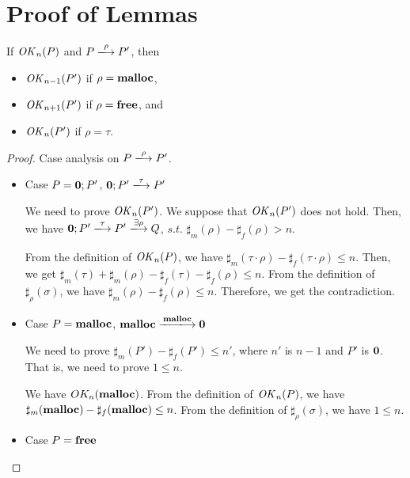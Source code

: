 \section{Proof of Lemmas}
\label{sec:proof}

\begin{lemma}
\label{lem:okPreserved}
If \(\mathit{OK}_n(P)\) and \(P \xlongrightarrow{\rho} P'\), then
\begin{itemize}
\item \(\mathit{OK}_{n-1}(P')\) if \(\rho = \mathbf{malloc}\),
\item \(\mathit{OK}_{n+1}(P')\) if \(\rho = \mathbf{free}\), and
\item \(\mathit{OK}_n(P')\) if \(\rho = \tau\).
\end{itemize}
\end{lemma}
\begin{proof}

Case analysis on \(P \xlongrightarrow{\rho} P'\).

\begin{itemize}
\item Case $P = \mathbf{0};P'$, \Rtab \(\TSKIP;P' \xlongrightarrow{\tau} P'\)

  We need to prove \(\mathit{OK}_n(P')\).   We suppose that
  \(\mathit{OK}_n(P')\) does not hold. Then, we have \(\TSKIP;P'
  \xlongrightarrow{\tau} P' \xlongrightarrow{\exists \rho}
  Q\), \(s.t.\) \(\sharp_{m}(\rho) - \sharp_{f}(\rho) > n\).

  From the definition of \(\mathit{OK}_n(P)\), we have \(\sharp_m(\tau \cdot
  \rho) - \sharp_f(\tau \cdot \rho) \le n \). Then, we get
  \(\sharp_m(\tau) + \sharp_m(\rho) - \sharp_f(\tau) - \sharp_f(\rho)
  \le n\). From the definition of \(\sharp_\rho(\sigma)\), we have
  \(\sharp_m(\rho) - \sharp_f(\rho) \le n\). Therefore, we get the
  contradiction.

\item Case $P = \mathbf{malloc}$, \Rtab \(\Malloc \xlongrightarrow{\Malloc} \TSKIP\)

  
We need to prove \(\sharp_{m}(P') -
\sharp_{f}(P') \le n'\), where \(n'\) is \(n - 1\) and \(P'\) is \(\bf
0\). That is, we need to prove \( 1 \le n \).

 We have\(\ OK_{n}(\mathbf{malloc})\). From the definition of \(\mathit{OK}_n(P)\),
 we have \(\sharp_{m}(\mathbf{malloc}) - \sharp_{f}(\mathbf{malloc}) \le
 n\). From the definition of \(\sharp_{\rho}(\sigma)\), we have
 \( 1 \le n\).

\item Case $P = \mathbf{free}$


\end{itemize}
\end{proof}
